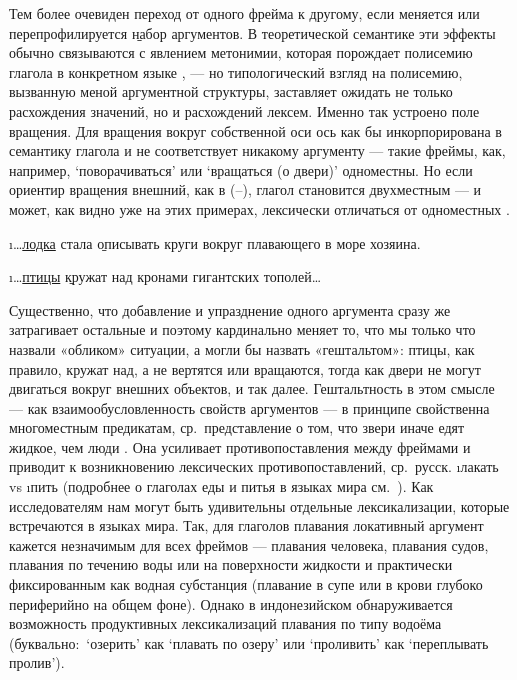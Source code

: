 Тем более очевиден переход от одного фрейма к другому, если меняется или перепрофилируется \b{набор} аргументов. В теоретической семантике эти эффекты обычно связываются с явлением метонимии, которая порождает полисемию глагола в конкретном языке \parencites{langacker1987}{paducheva2004}, — но типологический взгляд на полисемию, вызванную меной аргументной структуры, заставляет ожидать не только расхождения значений, но и расхождений лексем. Именно так устроено поле вращения. Для вращения вокруг собственной оси ось как бы инкорпорирована в семантику глагола и не соответствует никакому аргументу — такие фреймы, как, например, ‘поворачиваться’ или ‘вращаться (о двери)’ одноместны. Но если ориентир вращения внешний, как в (–), глагол становится двухместным — и может, как видно уже на этих примерах, лексически отличаться от одноместных \parencite{krugliakova2010}.

\i{…\underline{лодка} стала \b{описывать круги} вокруг плавающего в море хозяина.} 
\xe

\i{…\underline{птицы} \b{кружат над} кронами гигантских тополей…} 
\xe

Существенно, что добавление и упразднение одного аргумента сразу же затрагивает остальные и поэтому кардинально меняет то, что мы только что назвали «обликом» ситуации, а могли бы назвать «гештальтом»: птицы, как правило, кружат над, а не вертятся или вращаются, тогда как двери не могут двигаться вокруг внешних объектов, и так далее. Гештальтность в этом смысле — как взаимообусловленность свойств аргументов — в принципе свойственна многоместным предикатам, ср.~представление о том, что звери иначе едят жидкое, чем люди \parencite{croft2009}. Она усиливает противопоставления между фреймами и приводит к возникновению лексических противопоставлений, ср.~русск. \i{лакать} vs \i{пить} (подробнее о глаголах еды и питья в языках мира см.~\parencite{newman2009}). Как исследователям нам могут быть удивительны отдельные лексикализации, которые встречаются в языках мира. Так, для глаголов плавания локативный аргумент кажется незначимым для всех фреймов — плавания человека, плавания судов, плавания по течению воды или на поверхности жидкости \parencite{maisak_rakhilina2007} и практически фиксированным как водная субстанция (плавание в супе или в крови глубоко периферийно на общем фоне). Однако в индонезийском \parencite{lander_kramarova2007} обнаруживается возможность продуктивных лексикализаций плавания по типу водоёма (буквально:~‘озерить’ как ‘плавать по озеру’ или ‘проливить’ как ‘переплывать пролив’).

